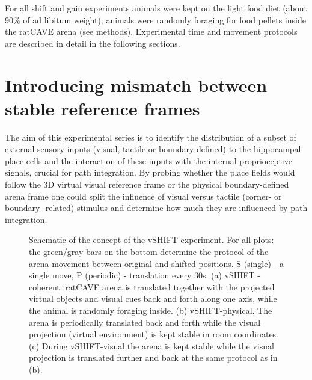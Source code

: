 For all shift and gain experiments animals were kept on the light food diet (about 90\% of ad libitum weight); animals were randomly foraging for food pellets inside the ratCAVE arena (see methods). Experimental time and movement protocols are described in detail in the following sections.


\section{Introducing mismatch between stable reference frames}
\label{sec:mismath_frames}

The aim of this experimental series is to identify the distribution of a subset of external sensory inputs (visual, tactile or boundary-defined) to the hippocampal place cells and the interaction of these inputs with the internal proprioceptive signals, crucial for path integration. By probing whether the place fields would follow the 3D virtual visual reference frame or the physical boundary-defined arena frame one could split the influence of visual versus tactile (corner- or boundary- related) stimulus and determine how much they are influenced by path integration.

\begin{figure}
\captionsetup{format=plain}
\caption[vSHIFT experiment]{
Schematic of the concept of the vSHIFT experiment. For all plots: the green/gray bars on the bottom determine the protocol of the arena movement between original and shifted positions. S (single) - a single move, P (periodic) - translation every 30s. (a) vSHIFT - coherent. ratCAVE arena is translated together with the projected virtual objects and visual cues  back and forth along one axis, while the animal is randomly foraging inside. (b) vSHIFT-physical. The arena is periodically translated back and forth while the visual projection (virtual environment) is kept stable in room coordinates. (c) During vSHIFT-visual the arena is kept stable while the visual projection is translated further and back at the same protocol as in (b).
}
\label{fig:F7_vSHIFT}
\end{figure}


